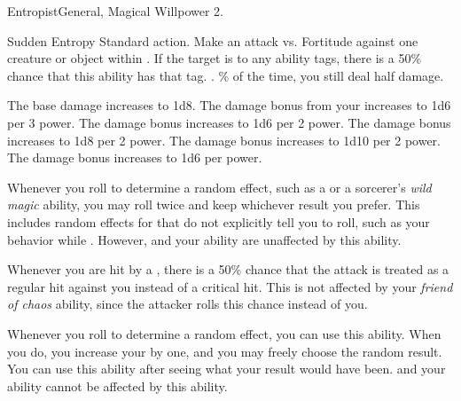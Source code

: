   \begin{magicalfeat}{Entropist}{General, Magical}
    \featpre Willpower 2.

    \begin{magicalactiveability}{Sudden Entropy}
      \abilityusagetime Standard action.
      \rankline
      Make an attack vs. Fortitude against one creature or object within \shortrange.
      If the target is \vulnerable to any ability tags, there is a 50\% chance that this ability has that tag.
      \hit \damageranktwo{}.
      \% of the time, you still deal half damage.

      \rankline
       The base damage increases to 1d8.
       The damage bonus from your  increases to 1d6 per 3 power.
       The damage bonus increases to 1d6 per 2 power.
       The damage bonus increases to 1d8 per 2 power.
       The damage bonus increases to 1d10 per 2 power.
       The damage bonus increases to 1d6 per power.
    \end{magicalactiveability}

     Whenever you roll to determine a random effect, such as a  or a sorcerer's \textit{wild magic} ability, you may roll twice and keep whichever result you prefer.
    This includes random effects for that do not explicitly tell you to roll, such as your behavior while \confused.
    However,  and your  ability are unaffected by this ability.

     Whenever you are hit by a , there is a 50\% chance that the attack is treated as a regular hit against you instead of a critical hit.
    This is not affected by your \textit{friend of chaos} ability, since the attacker rolls this chance instead of you.

     Whenever you roll to determine a random effect, you can use this ability.
    When you do, you increase your  by one, and you may freely choose the random result.
    You can use this ability after seeing what your result would have been.
     and your  ability cannot be affected by this ability.
  \end{magicalfeat}

